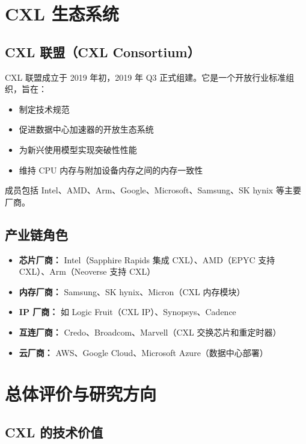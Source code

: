 \documentclass[12pt,a4paper]{article}
\begin{document}
\section{CXL 生态系统}

\subsection{CXL 联盟（CXL Consortium）}

CXL 联盟成立于 2019 年初，2019 年 Q3 正式组建。它是一个开放行业标准组织，旨在：

\begin{itemize}
    \item 制定技术规范
    \item 促进数据中心加速器的开放生态系统
    \item 为新兴使用模型实现突破性性能
    \item 维持 CPU 内存与附加设备内存之间的内存一致性
\end{itemize}

成员包括 Intel、AMD、Arm、Google、Microsoft、Samsung、SK hynix 等主要厂商。

\subsection{产业链角色}

\begin{itemize}
    \item \textbf{芯片厂商：} Intel（Sapphire Rapids 集成 CXL）、AMD（EPYC 支持 CXL）、Arm（Neoverse 支持 CXL）
    \item \textbf{内存厂商：} Samsung、SK hynix、Micron（CXL 内存模块）
    \item \textbf{IP 厂商：} 如 Logic Fruit（CXL IP）、Synopsys、Cadence
    \item \textbf{互连厂商：} Credo、Broadcom、Marvell（CXL 交换芯片和重定时器）
    \item \textbf{云厂商：} AWS、Google Cloud、Microsoft Azure（数据中心部署）
\end{itemize}

\section{总体评价与研究方向}

\subsection{CXL 的技术价值}
\end{document}
